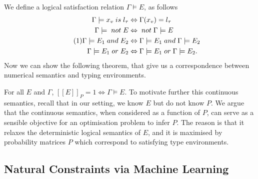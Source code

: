 \documentclass[acmsmall, review, anonymous]{acmart}\settopmatter{printfolios=true,printccs=false,printacmref=false}
\newcommand{\qqpi}[2]{[\![#2]\!]_{#1}}
\newcommand\numberthis{\addtocounter{equation}{1}\tag{\theequation}}
\newcommand{\margincomment}[2]{\marginpar{\scriptsize\color{Maroon}#1 says: #2}}
\newcommand{\cas}[1]{\margincomment{Charles}{#1}}
\begin{document}
We define  a logical satisfaction relation $\Gamma \models E$, as follows
          \begin{align*} 
              \Gamma \models x_v \mathrel{is} l_\tau & \Leftrightarrow \Gamma(x_v)=l_\tau                                  \\
              \Gamma \models{} \mathrel{not} E       & \Leftrightarrow{} \mathrel{not} \Gamma \models E                    \\ \numberthis \label{eq:logsat}
              \Gamma \models E_1 \mathrel{and} E_2   & \Leftrightarrow \Gamma \models E_1 \mathrel{and} \Gamma \models E_2 \\
              \Gamma \models E_1 \mathrel{or} E_2
                                                     & \Leftrightarrow \Gamma \models E_1 \mathrel{or} \Gamma \models E_2.
          \end{align*}
Now we can show the following theorem, that give us 
a correspondence between numerical semantics and typing environments. 
\label{thm:soft2hard}

  For all $E$ and $\Gamma$, $\qqpi{P}{E} = 1 \Leftrightarrow \Gamma \models E$.
To motivate further this continuous semantics, recall that in our setting, we know $E$ but
do not know $P$. We argue that the continuous semantics,
when considered as a function of $P$, can serve as a sensible
objective for an optimisation problem to infer $P$.
The reason is that it relaxes
the deterministic logical semantics of $E$, and it is maximised
by probability matrices $P$ which correspond to satisfying type environments.


\subsection{Natural Constraints via Machine Learning}\label{ssec:natcon}
\end{document}
